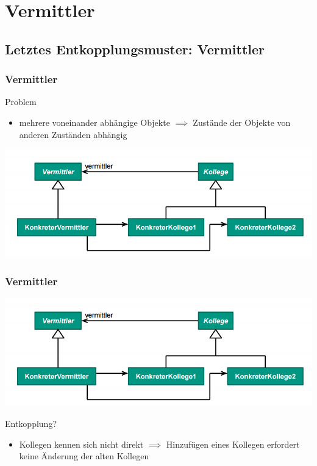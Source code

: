 \documentclass[18pt]{beamer}
\begin{document}
\section{Vermittler}
\subsection{Letztes Entkopplungsmuster: Vermittler}
	\begin{frame}
	\frametitle{Vermittler}
	\begin{block}{Problem}
		\begin{itemize}
			\item mehrere voneinander abhängige Objekte \linebreak \pause $\implies$ Zustände der Objekte von anderen Zuständen abhängig
		\end{itemize}
	\end{block}
	\pause
	\centering
	\includegraphics[scale=0.45]{./pics/tut3/med.png}
\end{frame}

\begin{frame}
	\frametitle{Vermittler}
	\centering
	\includegraphics[scale=0.45]{./pics/tut3/med.png}
	\begin{block}{Entkopplung?}
	\begin{itemize}
		\pause 
		\item Kollegen kennen sich nicht direkt  \linebreak \pause $\implies$ Hinzufügen eines Kollegen erfordert keine Änderung der alten Kollegen
	\end{itemize}
	\end{block}
\end{frame}
\end{document}
